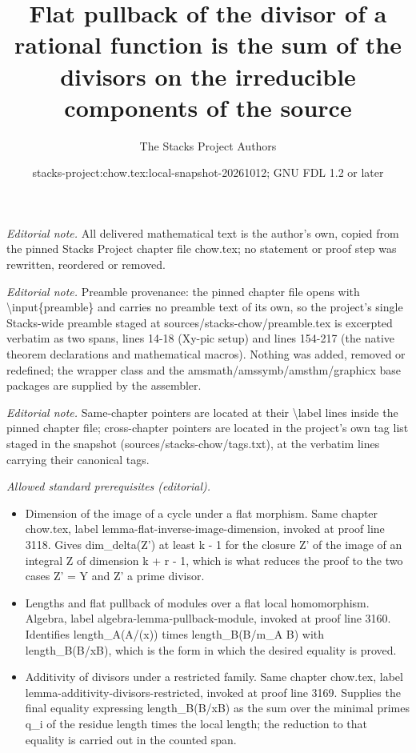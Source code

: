\documentclass[10pt,a4paper]{amsart}
\title{Flat pullback of the divisor of a rational function is the sum of the divisors on the irreducible components of the source}
\author{The Stacks Project Authors}
\date{stacks-project:chow.tex:local-snapshot-20261012; GNU FDL 1.2 or later}
\theoremstyle{plain}
\theoremstyle{definition}
\theoremstyle{remark}
\numberwithin{equation}{subsection}
\begin{document}
\maketitle
\noindent\textit{Editorial note.} All delivered mathematical text is the author's own, copied from the pinned Stacks Project chapter file chow.tex; no statement or proof step was rewritten, reordered or removed.\par\medskip
\noindent\textit{Editorial note.} Preamble provenance: the pinned chapter file opens with \textbackslash{}input\{preamble\} and carries no preamble text of its own, so the project's single Stacks-wide preamble staged at sources/stacks-chow/preamble.tex is excerpted verbatim as two spans, lines 14-18 (Xy-pic setup) and lines 154-217 (the native theorem declarations and mathematical macros). Nothing was added, removed or redefined; the wrapper class and the amsmath/amssymb/amsthm/graphicx base packages are supplied by the assembler.\par\medskip
\noindent\textit{Editorial note.} Same-chapter pointers are located at their \textbackslash{}label lines inside the pinned chapter file; cross-chapter pointers are located in the project's own tag list staged in the snapshot (sources/stacks-chow/tags.txt), at the verbatim lines carrying their canonical tags.\par\medskip
\noindent\textit{Allowed standard prerequisites (editorial).}\begin{itemize}
\item Dimension of the image of a cycle under a flat morphism. Same chapter chow.tex, label lemma-flat-inverse-image-dimension, invoked at proof line 3118. Gives dim\_delta(Z') at least k - 1 for the closure Z' of the image of an integral Z of dimension k + r - 1, which is what reduces the proof to the two cases Z' = Y and Z' a prime divisor.
\item Lengths and flat pullback of modules over a flat local homomorphism. Algebra, label algebra-lemma-pullback-module, invoked at proof line 3160. Identifies length\_A(A/(x)) times length\_B(B/m\_A B) with length\_B(B/xB), which is the form in which the desired equality is proved.
\item Additivity of divisors under a restricted family. Same chapter chow.tex, label lemma-additivity-divisors-restricted, invoked at proof line 3169. Supplies the final equality expressing length\_B(B/xB) as the sum over the minimal primes q\_i of the residue length times the local length; the reduction to that equality is carried out in the counted span.
\end{itemize}\medskip
\end{document}
